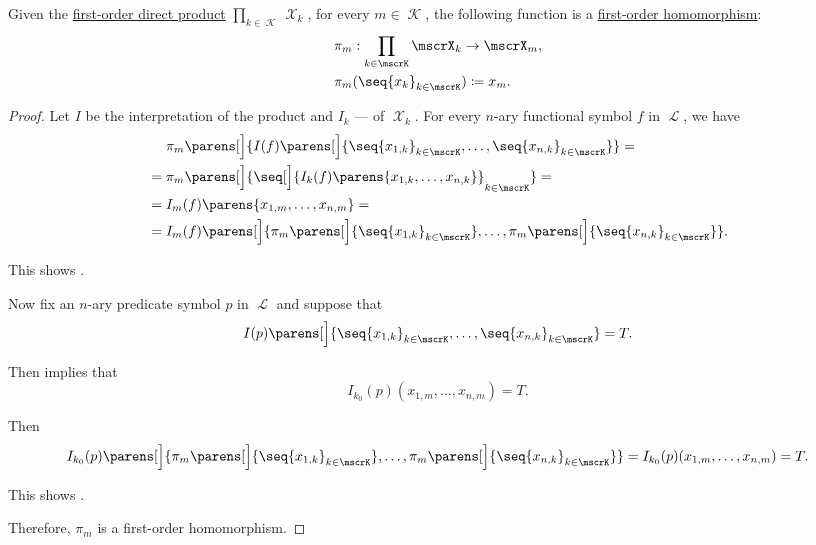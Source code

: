 \begin{proposition}\label{thm:direct_product_projections}
  Given the \hyperref[def:first_order_direct_product]{first-order direct product} \( \prod_{k \in \mscrK} \mscrX_k \), for every \( m \in \mscrK \), the following  function is a \hyperref[def:first_order_homomorphism]{first-order homomorphism}:
  \begin{equation*}
    \begin{aligned}
      &\pi_m: \prod_{k \in \mscrK} \mscrX_k \to \mscrX_m, \\
      &\pi_m(\seq{ x_k }_{k \in \mscrK}) \coloneqq x_m.
    \end{aligned}
  \end{equation*}
\end{proposition}
\begin{proof}
  Let \( I \) be the interpretation of the product and \( I_k \) --- of \( \mscrX_k \). For every \( n \)-ary functional symbol \( f \) in \( \mscrL \), we have
  \begin{align*}
    &\phantom{{}={}}
    \pi_m\parens[\Big]{ I(f)\parens[\Big]{ \seq{ x_{1,k} }_{k \in \mscrK}, \ldots, \seq{ x_{n,k} }_{k \in \mscrK} } }
    = \\ &=
    \pi_m\parens[\Big]{ \seq[\Big]{ I_k(f)\parens{ x_{1,k}, \ldots, x_{n,k} } }_{k \in \mscrK} }
    = \\ &=
    I_m(f)\parens{ x_{1,m}, \ldots, x_{n,m} }
    = \\ &=
    I_m(f)\parens[\Big]{ \pi_m\parens[\Big]{ \seq{ x_{1,k} }_{k \in \mscrK} }, \ldots, \pi_m\parens[\Big]{ \seq{ x_{n,k} }_{k \in \mscrK} } }.
  \end{align*}

  This shows .

  Now fix an \( n \)-ary predicate symbol \( p \) in \( \mscrL \) and suppose that
  \begin{equation*}
    I(p)\parens[\Big]{ \seq{ x_{1,k} }_{k \in \mscrK}, \ldots, \seq{ x_{n,k} }_{k \in \mscrK} } = T.
  \end{equation*}

  Then  implies that
  \begin{equation*}
    I_{k_0}(p)(x_{1,m}, \ldots, x_{n,m}) = T.
  \end{equation*}

  Then
  \begin{equation*}
    I_{k_0}(p)\parens[\Big]{ \pi_m\parens[\Big]{ \seq{ x_{1,k} }_{k \in \mscrK} }, \ldots, \pi_m\parens[\Big]{ \seq{ x_{n,k} }_{k \in \mscrK} } }
    =
    I_{k_0}(p)(x_{1,m}, \ldots, x_{n,m})
    =
    T.
  \end{equation*}

  This shows .

  Therefore, \( \pi_m \) is a first-order homomorphism.
\end{proof}

